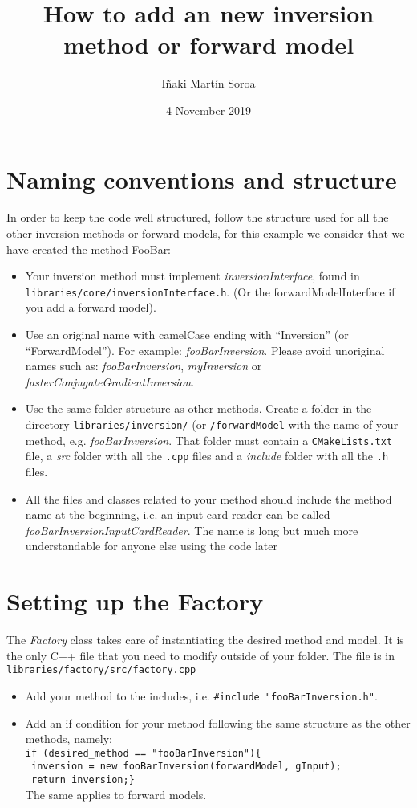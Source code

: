 \documentclass{article}
\title{How to add an new inversion method or forward model}
\author{I\~naki Mart\'in Soroa }
\date{4 November 2019}
\begin{document}
\maketitle

\section{Naming conventions and structure}
In order to keep the code well structured, follow the structure used for all the other inversion methods or forward models, for this example we consider that we have created the method FooBar:
\begin{itemize}
    \item Your inversion method must implement \textit{inversionInterface}, found in\\ \texttt{libraries/core/inversionInterface.h}. (Or the forwardModelInterface if you add a forward model).
    \item Use an original name with camelCase ending with ``Inversion'' (or ``ForwardModel''). For example: \textit{fooBarInversion}. Please avoid unoriginal names such as: \textit{fooBarInversion}, \textit{myInversion} or \textit{fasterConjugateGradientInversion}.
    \item Use the same folder structure as other methods. Create a folder in the directory \texttt{libraries/inversion/} (or \texttt{/forwardModel} with the name of your method, e.g. \textit{fooBarInversion}. That folder must contain a \texttt{CMakeLists.txt} file, a \textit{src} folder with all the \texttt{.cpp} files and a \textit{include} folder with all the \texttt{.h} files.
    \item All the files and classes related to your method should include the method name at the beginning, i.e. an input card reader can be called \textit{fooBarInversionInputCardReader}. The name is long but much more understandable for anyone else using the code later
\end{itemize}

\section{Setting up the Factory}
The \textit{Factory} class takes care of instantiating the desired method and model. It is the only C++ file that you need to modify outside of your folder. The file is in\\ \texttt{libraries/factory/src/factory.cpp}
\begin{itemize}
    \item Add your method to the includes, i.e. \texttt{\#include "fooBarInversion.h"}.
    \item Add an if condition for your method following the same structure as the other methods, namely:\\\texttt{if (desired\_method == "fooBarInversion")\{}\\\texttt{    inversion = new fooBarInversion(forwardModel, gInput);}\\\texttt{    return inversion;\}}\\ The same applies to forward models.
\end{itemize}
\end{document}
